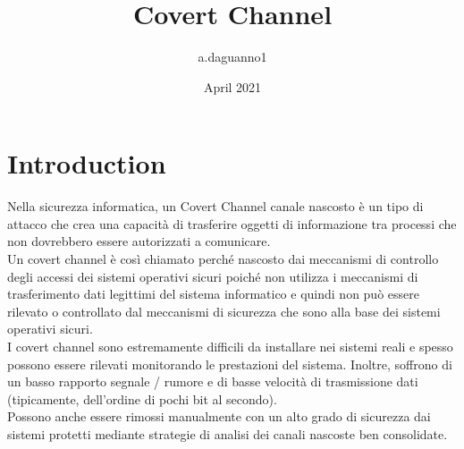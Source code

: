 \documentclass{article}
\title{Covert Channel}
\author{a.daguanno1 }
\date{April 2021}
\begin{document}
\maketitle

\section{Introduction}
Nella sicurezza informatica, un Covert Channel canale nascosto è un tipo di attacco che crea una capacità di trasferire oggetti di informazione tra processi che non dovrebbero essere autorizzati a comunicare.
\\Un covert channel è così chiamato perché nascosto dai meccanismi di controllo degli accessi dei sistemi operativi sicuri poiché non utilizza i meccanismi di trasferimento dati legittimi del sistema informatico e quindi non può essere rilevato o controllato dal meccanismi di sicurezza che sono alla base dei sistemi operativi sicuri.
\\I covert channel sono estremamente difficili da installare nei sistemi reali e spesso possono essere rilevati monitorando le prestazioni del sistema. Inoltre, soffrono di un basso rapporto segnale / rumore e di basse velocità di trasmissione dati (tipicamente, dell'ordine di pochi bit al secondo). 
\\Possono anche essere rimossi manualmente con un alto grado di sicurezza dai sistemi protetti mediante strategie di analisi dei canali nascoste ben consolidate.
\end{document}
